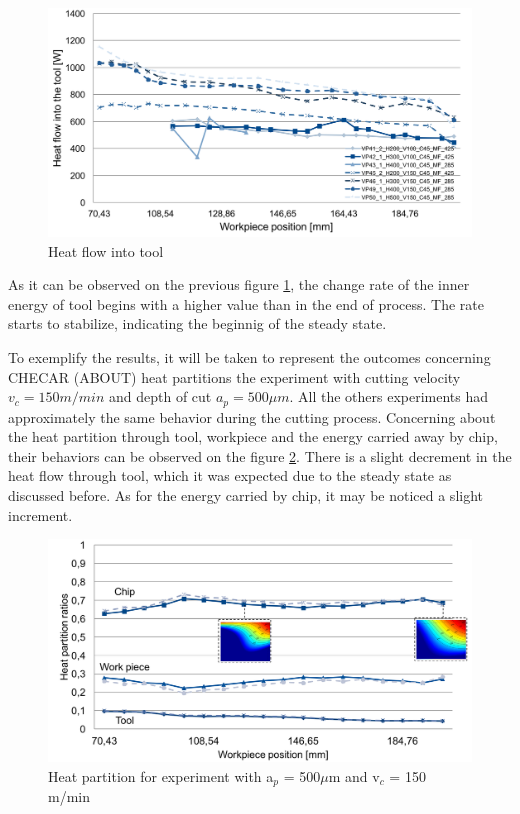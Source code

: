 	\begin{figure}[H]
		\centering
		\captionsetup{justification=centering}
		\includegraphics[scale=0.6]{Imagens/energyTool2.png}
		\caption{Heat flow into tool}
		\label{fig:hflowTool}
	\end{figure}

	As it can be observed on the previous figure \ref{fig:hflowTool}, the change rate of the inner energy of tool begins with a higher value than in the end of process. The rate starts to stabilize, indicating the beginnig of the steady state. 

	To exemplify the results, it will be taken to represent the outcomes concerning CHECAR (ABOUT) heat partitions the experiment with cutting velocity $v_{c} = 150 m/min$ and depth of cut $a_{p} = 500 \mu m$. All the others experiments had approximately the same behavior during the cutting process.
	Concerning about the heat partition through tool, workpiece and the energy carried away by chip, their behaviors can be observed on the figure \ref{fig:hpartExp}. There is a slight decrement in the heat flow through tool, which it was expected due to the steady state as discussed before. As for the energy carried by chip, it may be noticed a slight increment.

	\begin{figure}[H]
		\centering
		\captionsetup{justification=centering}
		\includegraphics[scale=0.6]{Imagens/partition500150.png}
		\caption{Heat partition for experiment with a$_{p}$ = 500$\mu$m and v$_{c}$ = 150 m/min}
		\label{fig:hpartExp}
	\end{figure}

